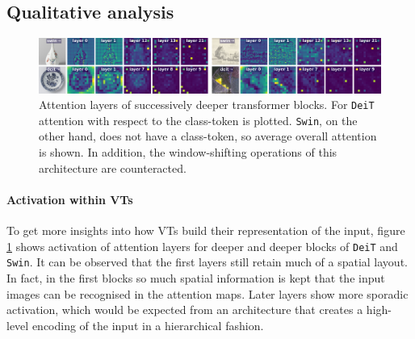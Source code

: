 \subsection{Qualitative analysis}

\begin{figure}[tb]
    \includegraphics[width=\textwidth]{img/layers.png}
    \caption{Attention layers of successively deeper transformer blocks. For \texttt{DeiT} attention with respect to the class-token is plotted. \texttt{Swin}, on the other hand, does not have a class-token, so average overall attention is shown. In addition, the window-shifting operations of this architecture are counteracted.}
    \label{results:img:layers}
\end{figure}

\paragraph{Activation within VTs} To get more insights into how VTs build their representation of the input, figure \ref{results:img:layers} shows activation of attention layers for deeper and deeper blocks of \texttt{DeiT} and \texttt{Swin}. It can be observed that the first layers still retain much of a spatial layout. In fact, in the first blocks so much spatial information is kept that the input images can be recognised in the attention maps. Later layers show more sporadic activation, which would be expected from an architecture that creates a high-level encoding of the input in a hierarchical fashion.

